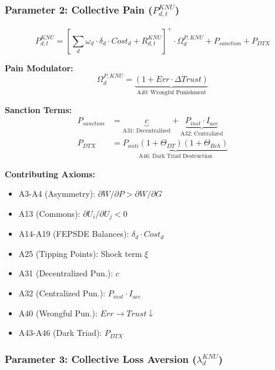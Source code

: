 \subsubsection{Parameter 2: Collective Pain ($P^{KNU}_{d,t}$)}

\begin{tcolorbox}[colback=green!5!white, colframe=green!50!black]
\begin{equation}
\boxed{
P^{KNU}_{d,t} = \left[ \sum_d \omega_d \cdot \delta_d \cdot Cost_d + R^{KNU}_{d,t} \right]^{+} \cdot \Omega^{P,KNU}_d + P_{sanction} + P_{DTX}
}
\end{equation}
\end{tcolorbox}

\textbf{Pain Modulator:}
\begin{equation}
\Omega^{P,KNU}_d = \underbrace{(1 + Err \cdot \Delta Trust)}_{\text{A40: Wrongful Punishment}}
\end{equation}

\textbf{Sanction Terms:}
\begin{align}
P_{sanction} &= \underbrace{c}_{\text{A31: Decentralized}} + \underbrace{P_{inst} \cdot I_{acc}}_{\text{A32: Centralized}} \\
P_{DTX} &= \underbrace{P_{anti}(1 + \Theta_{DT})(1 + \Theta_{Beh})}_{\text{A46: Dark Triad Destruction}}
\end{align}

\textbf{Contributing Axioms:}
\begin{itemize}
\item A3-A4 (Asymmetry): $\partial W/\partial P > \partial W/\partial G$
\item A13 (Commons): $\partial U_i / \partial U_j < 0$
\item A14-A19 (FEPSDE Balances): $\delta_d \cdot Cost_d$
\item A25 (Tipping Points): Shock term $\xi$
\item A31 (Decentralized Pun.): $c$
\item A32 (Centralized Pun.): $P_{inst} \cdot I_{acc}$
\item A40 (Wrongful Pun.): $Err \rightarrow Trust \downarrow$
\item A43-A46 (Dark Triad): $P_{DTX}$
\end{itemize}

\subsubsection{Parameter 3: Collective Loss Aversion ($\lambda^{KNU}_{d}$)}

